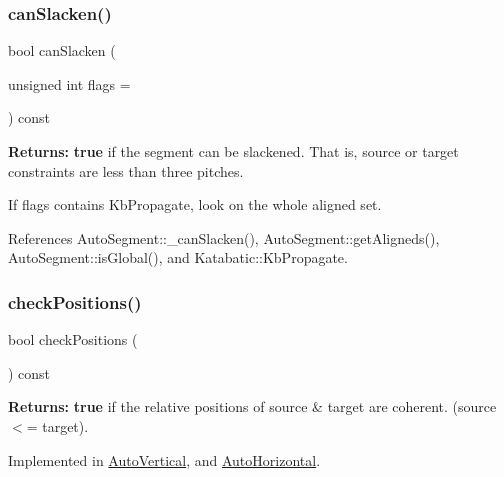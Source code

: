 \mbox{\label{classKatabatic_1_1AutoSegment_adec088de3c4c47a28ee9d58eb6d9cf85}} 
\subsubsection{\texorpdfstring{can\+Slacken()}{canSlacken()}}
{\footnotesize\ttfamily bool can\+Slacken (\begin{DoxyParamCaption}\item[{unsigned int}]{flags = {} }\end{DoxyParamCaption}) const}

{\bfseries Returns\+:} {\bfseries true} if the segment can be slackened. That is, source or target constraints are less than three pitches.

If {\ttfamily flags} contains Kb\+Propagate, look on the whole aligned set. 

References Auto\+Segment\+::\+\_\+can\+Slacken(), Auto\+Segment\+::get\+Aligneds(), Auto\+Segment\+::is\+Global(), and Katabatic\+::\+Kb\+Propagate.

\mbox{\label{classKatabatic_1_1AutoSegment_af026a81002bd907f1ccd4a4784aaa1db}} 
\subsubsection{\texorpdfstring{check\+Positions()}{checkPositions()}}
{\footnotesize\ttfamily bool check\+Positions (\begin{DoxyParamCaption}{ }\end{DoxyParamCaption}) const\hspace{0.3cm}{\ttfamily [pure virtual]}}

{\bfseries Returns\+:} {\bfseries true} if the relative positions of source \& target are coherent. (source $<$= target). 

Implemented in \hyperlink{classKatabatic_1_1AutoVertical_a6575c17bfa589c087215c87678e5719c}{Auto\+Vertical}, and \hyperlink{classKatabatic_1_1AutoHorizontal_a6575c17bfa589c087215c87678e5719c}{Auto\+Horizontal}.



